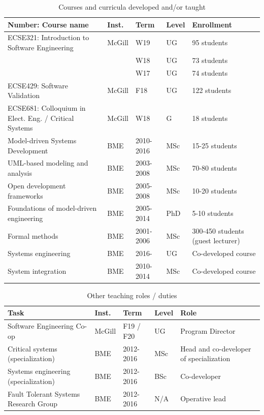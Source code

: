 \documentclass{xetexCV}
\begin{document}
\begin{table}[htb]
\begin{tabular}{@{}p{8cm}lllp{4cm}@{}}
\toprule
\textbf{Number: Course name} & \textbf{Inst.} & \textbf{Term} & \textbf{Level} & \textbf{Enrollment} \\ \midrule
ECSE321: Introduction to Software Engineering & McGill & W19& UG & 95 students \\
 &  & W18 & UG & 73 students \\
 &  & W17 & UG & 74 students \\ \midrule
ECSE429: Software Validation & McGill & F18& UG & 122 students \\ \midrule
ECSE681: Colloquium in Elect. Eng. / Critical Systems & McGill & W18& G & 18 students \\ \midrule
Model-driven Systems Development  & BME & 2010-2016 & MSc & 15-25 students \\
UML-based modeling and analysis  & BME & 2003-2008 & MSc & 70-80 students \\
Open development frameworks & BME & 2005-2008 & MSc & 10-20 students \\
Foundations of model-driven engineering & BME & 2005-2014 & PhD & 5-10 students \\
Formal methods & BME & 2001-2006 & MSc & 300-450 students \newline (guest lecturer) \\
Systems engineering & BME & 2016- & UG & Co-developed course\\
System integration & BME & 2010-2014 & MSc & Co-developed course\\
\bottomrule
\end{tabular}
\caption{Courses and curricula developed and/or taught}
\label{tab:courses-taught}
\end{table}

\begin{table}[htb]
\begin{tabular}{@{}p{8cm}lllp{4cm}@{}}
\toprule
\textbf{Task} & \textbf{Inst.} & \textbf{Term} & \textbf{Level} & \textbf{Role} \\ \midrule
Software Engineering Co-op & McGill & F19 / F20 & UG & Program Director\\ 
Critical systems (specialization) & BME & 2012-2016 & MSc & Head and co-developer of specialization \\
Systems engineering (specialization) & BME & 2012-2016 & BSc & Co-developer \\
Fault Tolerant Systems Research Group & BME & 2012-2016 & N/A & Operative lead \\
\bottomrule
\end{tabular}
\caption{Other teaching roles / duties}
\label{tab:other-teaching}
\end{table}
\end{document}
